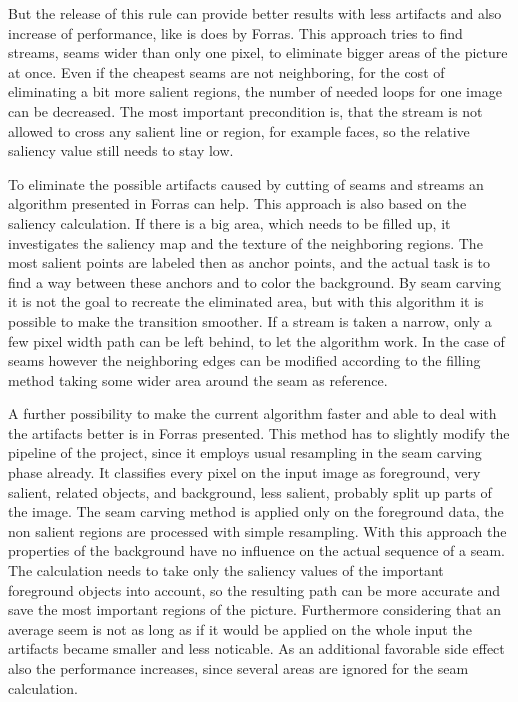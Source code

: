 \documentclass[draft,final]{vutinfth} %
\begin{document}
	But the release of this rule can provide better results with less artifacts and also increase of performance, like is does by Forras.
	This approach tries to find streams, seams wider than only one pixel, to eliminate bigger areas of the picture at once.
	Even if the cheapest seams are not neighboring, for the cost of eliminating a bit more salient regions, the number of needed loops for one image can be decreased.
	The most important precondition is, that the stream is not allowed to cross any salient line or region, for example faces, so the relative saliency value still needs to stay low. \par
	To eliminate the possible artifacts caused by cutting of seams and streams an algorithm presented in Forras can help.
	This approach is also based on the saliency calculation.
	If there is a big area, which needs to be filled up, it investigates the saliency map and the texture of the neighboring regions.
	The most salient points are labeled then as anchor points, and the actual task is to find a way between these anchors and to color the background.
	By seam carving it is not the goal to recreate the eliminated area, but with this algorithm it is possible to make the transition smoother.
	If a stream is taken a narrow, only a few pixel width path can be left behind, to let the algorithm work.
	In the case of seams however the neighboring edges can be modified according to the filling method taking some wider area around the seam as reference.\par 
	A further possibility to make the current algorithm faster and able to deal with the artifacts better is in Forras presented.
	This method has to slightly modify the pipeline of the project, since it employs usual resampling in the seam carving phase already.
	It classifies every pixel on the input image as foreground, very salient, related objects, and background, less salient, probably split up parts of the image.
	The seam carving method is applied only on the foreground data, the non salient regions are processed with simple resampling. 
	With this approach the properties of the background have no influence on the actual sequence of a seam.
	The calculation needs to take only the saliency values of the important foreground objects into account, so the resulting path can be more accurate and save the most important regions of the picture.
	Furthermore considering that an average seem is not as long as if it would be applied on the whole input the artifacts became smaller and less noticable.
	As an additional favorable side effect also the performance increases, since several areas are ignored for the seam calculation.    
	
\end{document}
